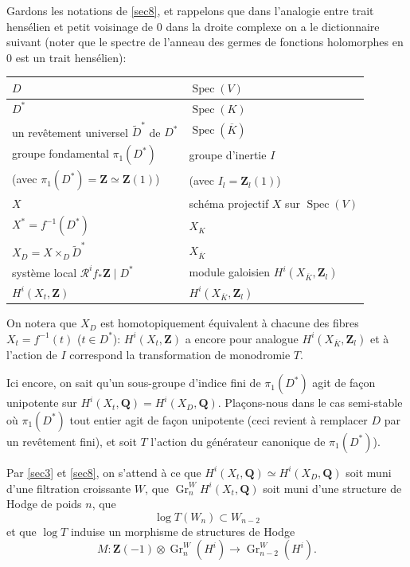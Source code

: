 \documentclass[12pt]{amsart}
\theoremstyle{definition}
\DeclareMathOperator{\Gr}{Gr}
\DeclareMathOperator{\Spec}{Spec}
\newcommand{\Q}{\mathbf{Q}}
\newcommand{\Z}{\mathbf{Z}}
\begin{document}
Gardons les notations de \ref{sec8}, et rappelons que dans l'analogie entre trait hensélien et petit voisinage de $0$ dans la droite complexe on a le dictionnaire suivant (noter que le spectre de l'anneau des germes de fonctions holomorphes en $0$ est un trait hensélien):

\begin{center}
\begin{tabular}{|l|l|}
\hline
$D$ & $\Spec(V)$ \\
\hline
$D^{*}$ & $\Spec(K)$ \\
\hline
un revêtement universel $\widetilde{D}^{*}$ de $D^{*}$ & $\Spec(\overline{K})$ \\
\hline
groupe fondamental $\pi_{1}(D^{*})$ & groupe d'inertie $I$ \\
\hline
(avec $\pi_{1}(D^{*}) = \Z \simeq \Z(1)$) & (avec $I_{l} = \Z_{l}(1)$) \\
\hline
$X$ & schéma projectif $X$ sur $\Spec(V)$ \\
\hline
$X^{*} = f^{-1}(D^{*})$ & $X_{K}$ \\
\hline
$X_{D} = X \times_{D} \widetilde{D}^{*}$ & $X_{\overline{K}}$ \\
\hline
système local $\mathscr{R}^{i}f_{*}\Z \mid D^{*}$ & module galoisien $H^{i}(X_{\overline{K}}, \Z_{l})$ \\
\hline
$H^{i}(X_{t}, \Z)$ & $H^{i}(X_{\overline{K}}, \Z_{l})$ \\
\hline
\end{tabular}
\end{center}

On notera que $X_{D}$ est homotopiquement équivalent à chacune des fibres $X_{t} = f^{-1}(t)$ ($t \in D^{*}$): $H^{i}(X_{t}, \Z)$ a encore pour analogue $H^{i}(X_{\overline{K}}, \Z_{l})$ et à l'action de $I$ correspond la transformation de monodromie $T$.

Ici encore, on sait qu'un sous-groupe d'indice fini de $\pi_{1}(D^{*})$ agit de façon unipotente sur $H^{i}(X_{t}, \Q) = H^{i}(X_{D}, \Q)$. Plaçons-nous dans le cas semi-stable où $\pi_{1}(D^{*})$ tout entier agit de façon unipotente (ceci revient à remplacer $D$ par un revêtement fini), et soit $T$ l'action du générateur canonique de $\pi_{1}(D^{*})$).

Par \ref{sec3} et \ref{sec8}, on s'attend à ce que $H^{i}(X_{t}, \Q) \simeq H^{i}(X_{D}, \Q)$ soit muni d'une filtration croissante $W$, que $\Gr_{n}^{W} H^{i}(X_{t}, \Q)$ soit muni d'une structure de Hodge de poids $n$, que
\[
\log T(W_{n}) \subset W_{n-2}
\]
et que $\log T$ induise un morphisme de structures de Hodge
\[
M : \Z(-1) \otimes \Gr_{n}^{W}(H^{i}) \to \Gr_{n-2}^{W}(H^{i}).
\]
\end{document}
